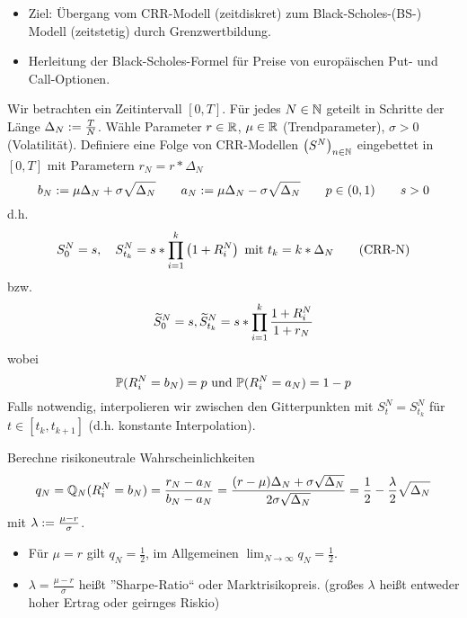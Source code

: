 \begin{itemize}
	\item Ziel: Übergang vom CRR-Modell (zeitdiskret) zum Black-Scholes-(BS-) Modell (zeitstetig) durch Grenzwertbildung.
	\item Herleitung der Black-Scholes-Formel für Preise von europäischen Put- und Call-Optionen.
\end{itemize}

Wir betrachten ein Zeitintervall $[0,T]$. Für jedes $N \in \mathbb{N}$ geteilt in Schritte der Länge $\Delta_N \mathrel{:=} \frac{T}{N}$. Wähle Parameter $r \in \mathbb{R}$, $\mu \in \mathbb{R}$ (Trendparameter), $\sigma > 0$ (Volatilität).
Definiere eine Folge von CRR-Modellen $\left( S^N \right)_{n \in \mathbb{N}}$ eingebettet in $[0,T]$ mit Parametern $r_N = r * \Delta_N$
\begin{equation*}
b_N \mathrel{:=} \mu \Delta_N + \sigma \sqrt{\Delta_N} \qquad a_N \mathrel{:=} \mu \Delta_N - \sigma \sqrt{\Delta_N} \qquad p \in (0,1) \qquad s > 0
\end{equation*}
d.h. 
\begin{equation*}
S_0^N = s, \quad S_{t_k}^N = s * \prod_{i=1}^{k} \left( 1 + R_i^N \right) \text{ mit } t_k = k * \Delta_N 
\tag{CRR-N}
\label{eq: crrn}
\end{equation*} 
bzw.
\begin{equation*}
\widetilde{S}_0^N = s, \widetilde{S}_{t_k}^N = s * \prod_{i=1}^k \frac{1 + R_i^N}{1 + r_N}
\end{equation*}
wobei
\begin{equation*}
\mathbb{P}(R_i^N = b_N) = p \text{ und } \mathbb{P}(R_i^N = a_N) = 1-p
\end{equation*}
Falls notwendig, interpolieren wir zwischen den Gitterpunkten mit $S_t^N = S_{t_k}^N$ für $t \in [t_k, t_{k+1}]$ (d.h. konstante Interpolation).

Berechne risikoneutrale Wahrscheinlichkeiten
\begin{equation*}
q_N = \mathbb{Q}_N(R_i^N = b_N) = \frac{r_N - a_N}{b_N - a_N} = \frac{(r-\mu) \Delta_N + \sigma \sqrt{\Delta_N}}{2 \sigma \sqrt{\Delta_N}} = \frac{1}{2} - \frac{\lambda}{2} \sqrt{\Delta_N}
\end{equation*}
mit $\lambda \mathrel{:=} \frac{\mu - r}{\sigma}$.

\begin{*bemerkung}
	\begin{itemize}
		\item Für $\mu = r$ gilt $q_N = \frac{1}{2}$, im Allgemeinen $\lim_{N \to \infty} q_N = \frac{1}{2}$.
		\item $\lambda = \frac{\mu - r}{\sigma}$ heißt ''Sharpe-Ratio`` oder Marktrisikopreis. (großes $\lambda$ heißt entweder hoher Ertrag oder geirnges Riskio)
	\end{itemize}
\end{*bemerkung}

